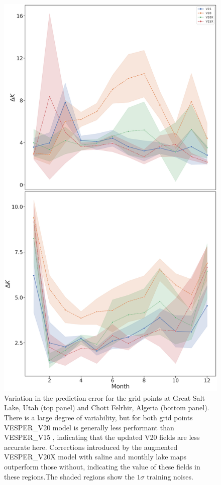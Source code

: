 \documentclass[hess, twostagejnl]{copernicus}
\providecommand{\DIFadd}[1]{{\protect\color{blue} \sf #1}} %
\providecommand{\DIFaddFL}[1]{\DIFadd{#1}} %
\providecommand{\DIFaddendFL}{} %
\begin{document}
	\begin{figure}
	\includegraphics[scale=0.2]{timeseries_slc_chott}
	\caption{\DIFaddFL{Variation in the prediction error for the grid points at Great Salt Lake, Utah (top panel) and Chott Felrhir, Algeria (bottom panel). There is a large degree of variability, but for both grid points VESPER\_V20 model is generally less performant than VESPER\_V15 , indicating that the updated V20 fields are less accurate here. Corrections introduced by the augmented VESPER\_V20X model with saline and monthly lake maps outperform those without, indicating the value of these fields in these regions.The shaded regions show the $1 \sigma$ training noises.}} 
	\DIFaddendFL \label{fig:timeseries_stacked}
\end{figure}
\end{document}
